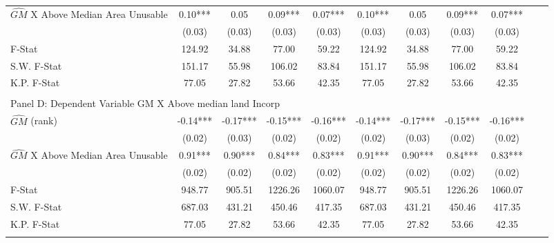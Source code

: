 \begin{table}[htbp]
\begin{threeparttable}
\begin{tabular}{l*{10}{c}}
\addlinespace
$\hat{GM}$ X Above Median Area Unusable&       0.10***&       0.05   &       0.09***&       0.07***&       0.10***&       0.05   &       0.09***&       0.07***\\
                &     (0.03)   &     (0.03)   &     (0.03)   &     (0.03)   &     (0.03)   &     (0.03)   &     (0.03)   &     (0.03)   \\
\midrule
F-Stat          &     124.92   &      34.88   &      77.00   &      59.22   &     124.92   &      34.88   &      77.00   &      59.22   \\
S.W. F-Stat     &     151.17   &      55.98   &     106.02   &      83.84   &     151.17   &      55.98   &     106.02   &      83.84   \\
K.P. F-Stat     &      77.05   &      27.82   &      53.66   &      42.35   &      77.05   &      27.82   &      53.66   &      42.35   \\
\cmidrule[\heavyrulewidth](lr){1-9} \\ \cmidrule[\heavyrulewidth](lr){1-9}
\multicolumn{8}{l}{Panel D: Dependent Variable GM X Above median land Incorp}\\
\cmidrule(lr){1-9}
$\hat{GM}$ (rank)&      -0.14***&      -0.17***&      -0.15***&      -0.16***&      -0.14***&      -0.17***&      -0.15***&      -0.16***\\
                &     (0.02)   &     (0.03)   &     (0.02)   &     (0.02)   &     (0.02)   &     (0.03)   &     (0.02)   &     (0.02)   \\
\addlinespace
$\hat{GM}$ X Above Median Area Unusable&       0.91***&       0.90***&       0.84***&       0.83***&       0.91***&       0.90***&       0.84***&       0.83***\\
                &     (0.02)   &     (0.02)   &     (0.02)   &     (0.02)   &     (0.02)   &     (0.02)   &     (0.02)   &     (0.02)   \\
\midrule
F-Stat          &     948.77   &     905.51   &    1226.26   &    1060.07   &     948.77   &     905.51   &    1226.26   &    1060.07   \\
S.W. F-Stat     &     687.03   &     431.21   &     450.46   &     417.35   &     687.03   &     431.21   &     450.46   &     417.35   \\
K.P. F-Stat     &      77.05   &      27.82   &      53.66   &      42.35   &      77.05   &      27.82   &      53.66   &      42.35   \\
\cmidrule[\heavyrulewidth](lr){1-9} \\ \cmidrule[\heavyrulewidth](lr){1-9}

\end{tabular}
\end{threeparttable}
\end{table}
